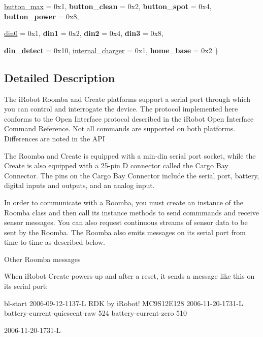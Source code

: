 \begin{DoxyCompactItemize}
\hyperlink{namespacemasks_af347462787e0a87a423f606696c00f3cad7c6e4d35f069b98f08831fcfc006b18}{button\_\-max} =  0x1, 
{\bfseries button\_\-clean} =  0x2, 
{\bfseries button\_\-spot} =  0x4, 
{\bfseries button\_\-power} =  0x8, 
\par
\hyperlink{namespacemasks_af347462787e0a87a423f606696c00f3cac916e1c4aab1503782956c120a807c6c}{din0} =  0x1, 
{\bfseries din1} =  0x2, 
{\bfseries din2} =  0x4, 
{\bfseries din3} =  0x8, 
\par
{\bfseries din\_\-detect} =  0x10, 
\hyperlink{namespacemasks_af347462787e0a87a423f606696c00f3ca8226dd177b71ac5b6a86bb8b2cd0f84c}{internal\_\-charger} =  0x1, 
{\bfseries home\_\-base} =  0x2
 \}
\end{DoxyCompactItemize}


\subsection{Detailed Description}
The iRobot Roomba and Create platforms support a serial port through which you can control and interrogate the device. The protocol implemented here conforms to the Open Interface protocol described in the iRobot Open Interface Command Reference. Not all commands are supported on both platforms. Differences are noted in the API

The Roomba and Create is equipped with a min-\/din serial port socket, while the Create is also equipped with a 25-\/pin D connector called the Cargo Bay Connector. The pins on the Cargo Bay Connector include the serial port, battery, digital inputs and outputs, and an analog input.

In order to communicate with a Roomba, you must create an instance of the Roomba class and then call its instance methods to send commmands and receive sensor messages. You can also request continuous streams of sensor data to be sent by the Roomba. The Roomba also emits messages on its serial port from time to time as described below.

\begin{DoxyParagraph}{Other Roomba messages}

\end{DoxyParagraph}
When iRobot Create powers up and after a reset, it sends a message like this on its serial port: 
\begin{DoxyCode}
 bl-start
 2006-09-12-1137-L
 RDK by iRobot!
 MC9S12E128
 2006-11-20-1731-L
 battery-current-quiescent-raw 524  battery-current-zero 510

 2006-11-20-1731-L
\end{DoxyCode}


